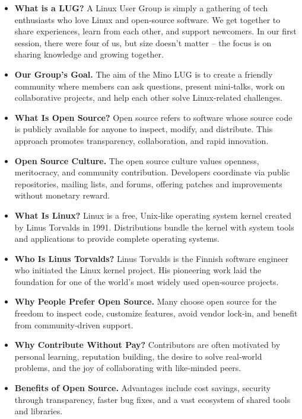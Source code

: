     \begin{itemize}
    	\item \textbf{What is a LUG?} A Linux User Group is simply a gathering of tech enthusiasts who love Linux and open‐source software. We get together to share experiences, learn from each other, and support newcomers. In our first session, there were four of us, but size doesn’t matter -- the focus is on sharing knowledge and growing together.
    	\item \textbf{Our Group’s Goal.} The aim of the Mino LUG is to create a friendly community where members can ask questions, present mini‐talks, work on collaborative projects, and help each other solve Linux‑related challenges.
    	\item \textbf{What Is Open Source?} Open source refers to software whose source code is publicly available for anyone to inspect, modify, and distribute. This approach promotes transparency, collaboration, and rapid innovation.
    	\item \textbf{Open Source Culture.} The open source culture values openness, meritocracy, and community contribution. Developers coordinate via public repositories, mailing lists, and forums, offering patches and improvements without monetary reward.
    	\item \textbf{What Is Linux?} Linux is a free, Unix‐like operating system kernel created by Linus Torvalds in 1991. Distributions bundle the kernel with system tools and applications to provide complete operating systems.
    	\item \textbf{Who Is Linus Torvalds?} Linus Torvalds is the Finnish software engineer who initiated the Linux kernel project. His pioneering work laid the foundation for one of the world’s most widely used open‐source projects.
    	\item \textbf{Why People Prefer Open Source.} Many choose open source for the freedom to inspect code, customize features, avoid vendor lock‑in, and benefit from community‐driven support.
    	\item \textbf{Why Contribute Without Pay?} Contributors are often motivated by personal learning, reputation building, the desire to solve real‑world problems, and the joy of collaborating with like‑minded peers.
    	\item \textbf{Benefits of Open Source.} Advantages include cost savings, security through transparency, faster bug fixes, and a vast ecosystem of shared tools and libraries.
    \end{itemize}
    
